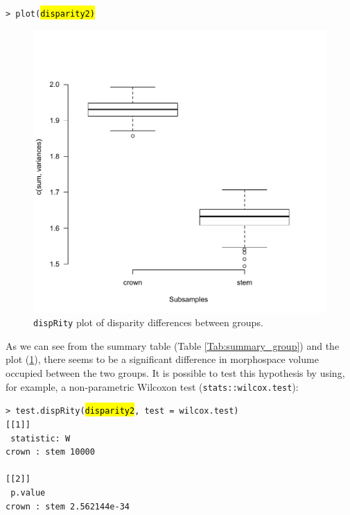 \documentclass[12pt,letterpaper]{article}
\newcommand{\disp}{\texttt{dispRity} }
\begin{document}
\noindent \texttt{> plot(\hl{disparity2)}}

\begin{figure}[!htbp]
\centering
   \includegraphics[width=1\textwidth]{plot_example_group.pdf} 
\caption{\disp plot of disparity differences between groups.}
\label{Fig:plot_group}
\end{figure}

As we can see from the summary table (Table \ref{Tab:summary_group}) and the plot (\ref{Fig:plot_group}), there seems to be a significant difference in morphospace volume occupied between the two groups.
It is possible to test this hypothesis by using, for example, a non-parametric Wilcoxon test (\texttt{stats::wilcox.test}):

\noindent \texttt{> test.dispRity(\hl{disparity2}, test = wilcox.test)}\\

\noindent \texttt{[[1]]}\\
\noindent \texttt{          statistic: W}\\
\noindent \texttt{crown : stem     10000}\\
\noindent \texttt{ }\\
\noindent \texttt{[[2]]}\\
\noindent \texttt{                  p.value}\\
\noindent \texttt{crown : stem 2.562144e-34}\\
\end{document}
